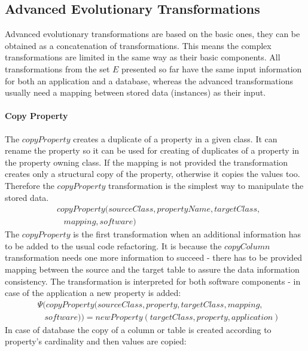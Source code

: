 \documentclass[runningheads]{comsis}
\begin{document}
\subsection{Advanced Evolutionary Transformations}
\label{sec:sw-adv-evolution}
Advanced evolutionary transformations are based on the basic ones, they can be obtained as a concatenation of transformations. This means the complex transformations are limited in the same way as their basic components. All transformations from the set $E$ presented so far have the same input information for both an application and a database, whereas the advanced transformations usually need a mapping between stored data (instances) as their input. 


\paragraph{Copy Property}
The $copyProperty$ creates a duplicate of a property in a given class. It can rename the property so it can be used for creating of duplicates of a property in the property owning class. If the mapping is not provided the transformation creates only a structural copy of the property, otherwise it copies the values too. Therefore the  $copyProperty$ transformation is the simplest way to manipulate the stored data.
\begin{align}
& copyProperty(sourceClass, propertyName, targetClass, \nonumber  \\
& \; \; \; mapping, software) 
\end{align}
The  $copyProperty$ is the first transformation when an additional information has to be added to the usual code refactoring. It is because the $copyColumn$ transformation needs one more information to succeed - there has to be provided mapping between the source and the target table to assure the data information consistency. %
The transformation is interpreted for both software components - in case of the application a new property is added:
\begin{align}
& \Psi(copyProperty(sourceClass, property, targetClass, mapping, \nonumber  \\ 
&  \; \; \; software)) = newProperty(targetClass, property, application) 
\end{align}
In case of database the copy of a column or table is created according to property's cardinality and then values are copied:
\end{document}
